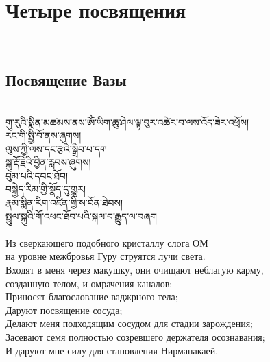 \section{Четыре посвящения}
\\
\subsection{Посвящение Вазы}
\\
\ti
གུ་རུའི་སྨིན་མཚམས་ནས་ཨོཾ་ཡིག་ཆུ་ཤེལ་ལྟ་བུར་འཚེར་བ་ལས་འོད་ཟེར་འཕྲོས།\\
རང་གི་སྤྱི་བོ་ནས་ཞུགས།\\
ལུས་ཀྱི་ལས་དང་རྩའི་སྒྲིབ་པ་དག\\
སྐུ་རྡོ་རྗེའི་བྱིན་རླབས་ཞུགས།\\
བུམ་པའི་དབང་ཐོབ།\\
བསྐྱེད་རིམ་གྱི་སྣོད་དུ་གྱུར།\\
རྣམ་སྨིན་རིག་འཛིན་གྱི་ས་བོན་ཐེབས།\\
སྤྲུལ་སྐུའི་གོ་འཕང་ཐོབ་པའི་སྐལ་བ་རྒྱུད་ལ་བཞག\\
\\
\ru
Из сверкающего подобного кристаллу слога ОМ \\
на уровне межбровья Гуру струятся лучи света.\\
Входят в меня через макушку, они очищают неблагую карму, \\
созданную телом, и омрачения каналов;\\
Приносят благослование ваджрного тела;\\
Даруют посвящение сосуда;\\
Делают меня подходящим сосудом для стадии зарождения;\\
Засевают семя полностью созревшего держателя осознавания;\\
И даруют мне силу для становления Нирманакаей.

\newpage
